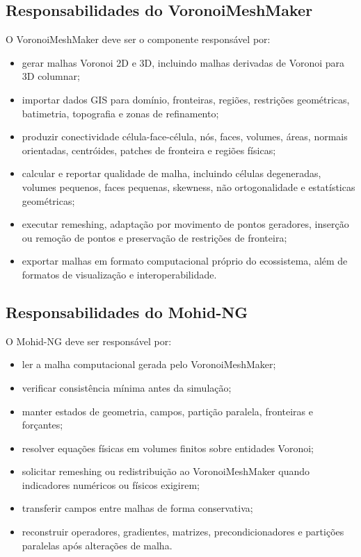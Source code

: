 \documentclass[11pt,a4paper]{article}
\begin{document}
\subsection{Responsabilidades do VoronoiMeshMaker}

O VoronoiMeshMaker deve ser o componente respons\'avel por:
\begin{itemize}
  \item gerar malhas Voronoi 2D e 3D, incluindo malhas derivadas de Voronoi para 3D columnar;
  \item importar dados GIS para dom\'inio, fronteiras, regi\~oes, restri\c{c}\~oes geom\'etricas, batimetria, topografia e zonas de refinamento;
  \item produzir conectividade c\'elula-face-c\'elula, n\'os, faces, volumes, \'{a}reas, normais orientadas, centr\'oides, patches de fronteira e regi\~oes f\'isicas;
  \item calcular e reportar qualidade de malha, incluindo c\'elulas degeneradas, volumes pequenos, faces pequenas, skewness, n\~ao ortogonalidade e estat\'isticas geom\'etricas;
  \item executar remeshing, adapta\c{c}\~ao por movimento de pontos geradores, inser\c{c}\~ao ou remo\c{c}\~ao de pontos e preserva\c{c}\~ao de restri\c{c}\~oes de fronteira;
  \item exportar malhas em formato computacional pr\'oprio do ecossistema, al\'em de formatos de visualiza\c{c}\~ao e interoperabilidade.
\end{itemize}

\subsection{Responsabilidades do Mohid-NG}

O Mohid-NG deve ser respons\'avel por:
\begin{itemize}
  \item ler a malha computacional gerada pelo VoronoiMeshMaker;
  \item verificar consist\^encia m\'inima antes da simula\c{c}\~ao;
  \item manter estados de geometria, campos, parti\c{c}\~ao paralela, fronteiras e for\c{c}antes;
  \item resolver equa\c{c}\~oes f\'isicas em volumes finitos sobre entidades Voronoi;
  \item solicitar remeshing ou redistribui\c{c}\~ao ao VoronoiMeshMaker quando indicadores num\'ericos ou f\'isicos exigirem;
  \item transferir campos entre malhas de forma conservativa;
  \item reconstruir operadores, gradientes, matrizes, precondicionadores e parti\c{c}\~oes paralelas ap\'os altera\c{c}\~oes de malha.
\end{itemize}
\end{document}
